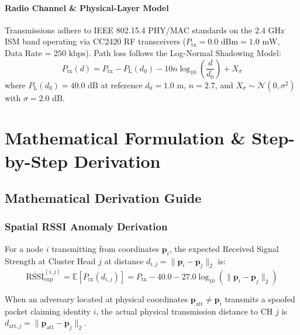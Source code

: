 \documentclass[11pt,a4paper,oneside]{book}
\begin{document}
\subsection{Radio Channel \& Physical-Layer Model}
Transmissions adhere to IEEE 802.15.4 PHY/MAC standards on the $2.4\text{ GHz}$ ISM band operating via CC2420 RF transceivers ($P_{\text{tx}} = 0.0\text{ dBm} = 1.0\text{ mW}$, Data Rate = $250\text{ kbps}$). Path loss follows the Log-Normal Shadowing Model:
\begin{equation}
P_{\text{rx}}(d) = P_{\text{tx}} - P_{\text{L}}(d_0) - 10 n \log_{10}\left(\frac{d}{d_0}\right) + X_{\sigma}
\end{equation}
where $P_{\text{L}}(d_0) = 40.0\text{ dB}$ at reference $d_0 = 1.0\text{ m}$, $n = 2.7$, and $X_{\sigma} \sim \mathcal{N}(0, \sigma^2)$ with $\sigma = 2.0\text{ dB}$.

\part{Mathematical Formulation \& Step-by-Step Derivation}

\chapter{Mathematical Derivation Guide}

\section{Spatial RSSI Anomaly Derivation}
For a node $i$ transmitting from coordinates $\boldsymbol{p}_i$, the expected Received Signal Strength at Cluster Head $j$ at distance $d_{i,j} = \|\boldsymbol{p}_i - \boldsymbol{p}_j\|_2$ is:
\begin{equation}
\overline{\text{RSSI}}_{\text{exp}}^{(i, j)} = \mathbb{E}[P_{\text{rx}}(d_{i,j})] = P_{\text{tx}} - 40.0 - 27.0 \log_{10}\left(\|\boldsymbol{p}_i - \boldsymbol{p}_j\|_2\right)
\end{equation}

When an adversary located at physical coordinates $\boldsymbol{p}_{\text{att}} \neq \boldsymbol{p}_i$ transmits a spoofed packet claiming identity $i$, the actual physical transmission distance to CH $j$ is $d_{\text{att}, j} = \|\boldsymbol{p}_{\text{att}} - \boldsymbol{p}_j\|_2$.
\end{document}

